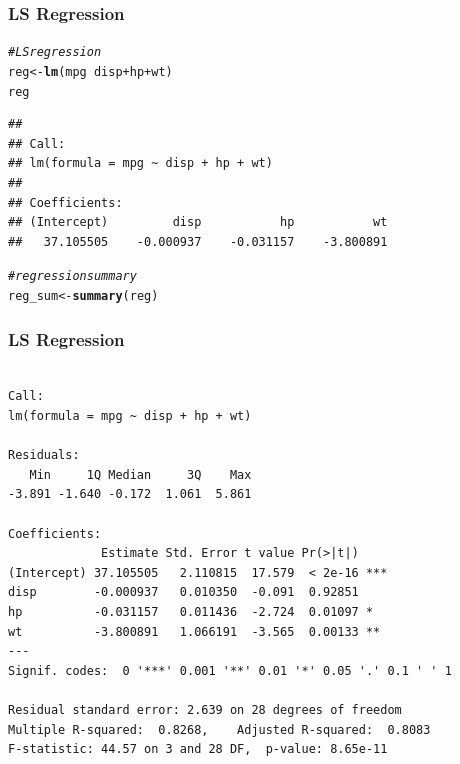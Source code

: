\documentclass[12pt]{beamer}\usepackage[]{graphicx}\usepackage[]{color}
\makeatletter
\newcommand{\hlcom}[1]{\textcolor[rgb]{0.678,0.584,0.686}{\textit{#1}}}%
\newcommand{\hlopt}[1]{\textcolor[rgb]{0,0,0}{#1}}%
\newcommand{\hlstd}[1]{\textcolor[rgb]{0.345,0.345,0.345}{#1}}%
\newcommand{\hlkwb}[1]{\textcolor[rgb]{0.69,0.353,0.396}{#1}}%
\newcommand{\hlkwd}[1]{\textcolor[rgb]{0.737,0.353,0.396}{\textbf{#1}}}%
\newenvironment{kframe}{%
 \def\at@end@of@kframe{}%
 \ifinner\ifhmode%
  \def\at@end@of@kframe{\end{minipage}}%
  \begin{minipage}{\columnwidth}%
 \fi\fi%
 \def\FrameCommand##1{\hskip\@totalleftmargin \hskip-\fboxsep
 \colorbox{shadecolor}{##1}\hskip-\fboxsep
     \hskip-\linewidth \hskip-\@totalleftmargin \hskip\columnwidth}%
 \MakeFramed {\advance\hsize-\width
   \@totalleftmargin\z@ \linewidth\hsize
   \@setminipage}}%
 {\par\unskip\endMakeFramed%
 \at@end@of@kframe}
\newenvironment{knitrout}{}{} %
\makeatother
\begin{document}

\begin{frame}[fragile]
\frametitle{LS Regression}

\begin{knitrout}\footnotesize
{}\color{fgcolor}\begin{kframe}
\begin{alltt}
\hlcom{# LS regression}
\hlstd{reg} \hlkwb{<-} \hlkwd{lm}\hlstd{(mpg} \hlopt{~} \hlstd{disp} \hlopt{+} \hlstd{hp} \hlopt{+} \hlstd{wt)}
\hlstd{reg}
\end{alltt}
\begin{verbatim}
## 
## Call:
## lm(formula = mpg ~ disp + hp + wt)
## 
## Coefficients:
## (Intercept)         disp           hp           wt  
##   37.105505    -0.000937    -0.031157    -3.800891
\end{verbatim}
\begin{alltt}
\hlcom{# regression summary}
\hlstd{reg_sum} \hlkwb{<-} \hlkwd{summary}\hlstd{(reg)}
\end{alltt}
\end{kframe}
\end{knitrout}

\end{frame}


\begin{frame}[fragile]
\frametitle{LS Regression}

\begin{knitrout}\scriptsize
{}\color{fgcolor}\begin{kframe}
\begin{verbatim}

Call:
lm(formula = mpg ~ disp + hp + wt)

Residuals:
   Min     1Q Median     3Q    Max 
-3.891 -1.640 -0.172  1.061  5.861 

Coefficients:
             Estimate Std. Error t value Pr(>|t|)    
(Intercept) 37.105505   2.110815  17.579  < 2e-16 ***
disp        -0.000937   0.010350  -0.091  0.92851    
hp          -0.031157   0.011436  -2.724  0.01097 *  
wt          -3.800891   1.066191  -3.565  0.00133 ** 
---
Signif. codes:  0 '***' 0.001 '**' 0.01 '*' 0.05 '.' 0.1 ' ' 1

Residual standard error: 2.639 on 28 degrees of freedom
Multiple R-squared:  0.8268,	Adjusted R-squared:  0.8083 
F-statistic: 44.57 on 3 and 28 DF,  p-value: 8.65e-11
\end{verbatim}
\end{kframe}
\end{knitrout}

\end{frame}
\end{document}
